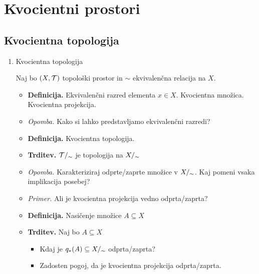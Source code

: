 \section{Kvocientni prostori}

\subsection{Kvocientna topologija}
\begin{enumerate}
    \item Kvocientna topologija
    
    Naj bo \((X, \mathcal{T})\) topološki prostor in \(\sim\) ekvivalenčna relacija na \(X\).
    \begin{itemize}
        \item \colorbox{purple!30}{\textbf{Definicija.}} Ekvivalenčni razred elementa \(x \in X\). Kvocientna množica. Kvocientna projekcija.
        \item \colorbox{yellow!30}{\emph{Opomba.}} Kako si lahko predstavljamo ekvivalenčni razredi?
        \item \colorbox{purple!30}{\textbf{Definicija.}} Kvocientna topologija.
        \item \colorbox{blue!30}{\textbf{Trditev.}} \(\mathcal{T}/_\sim\) je topologija na \({X/_\sim}\)
        \item \colorbox{yellow!30}{\emph{Opomba.}}  Karakteriziraj odprte/zaprte množice v \({X/_\sim}\). Kaj pomeni vsaka implikacija posebej?
        \item \colorbox{yellow!30}{\emph{Primer.}} Ali je kvocientna projekcija vedno odprta/zaprta?
        \item \colorbox{purple!30}{\textbf{Definicija.}} Nasičenje množice \(A \subseteq X\)
        \item \colorbox{blue!30}{\textbf{Trditev.}} Naj bo \(A \subseteq X\) 
        \begin{itemize}
            \item Kdaj je \(q_{*}(A) \subseteq {X/_\sim}\) odprta/zaprta?
            \item Zadosten pogoj, da je kvocientna projekcija odprta/zaprta.
        \end{itemize}
    \end{itemize}
\end{enumerate}

